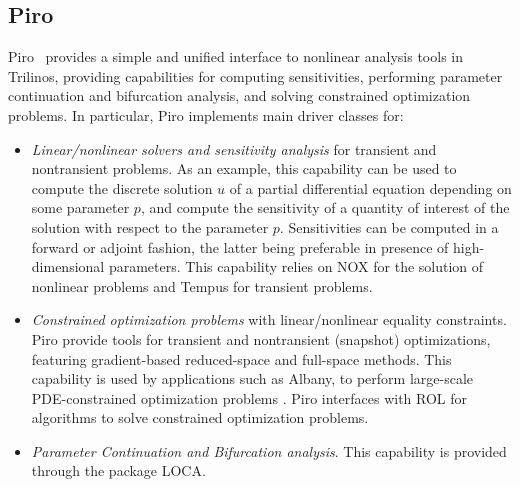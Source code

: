 \subsection{Piro}
Piro~\cite{osti_1231283} provides a simple and unified interface to nonlinear analysis tools in Trilinos, providing capabilities for computing sensitivities, performing parameter continuation and bifurcation analysis, and solving constrained optimization problems.
In particular, Piro implements main driver classes for:
\begin{itemize}
	\item \emph{Linear/nonlinear solvers and sensitivity analysis} for transient and nontransient problems. As an example, this capability can be used to compute the discrete solution $u$ of a partial differential equation depending on some parameter $p$, and compute the sensitivity of a quantity of interest of the solution with respect to the parameter $p$. Sensitivities can be computed in a forward or adjoint fashion, the latter being preferable in presence of high-dimensional parameters. This capability relies on NOX for the solution of nonlinear problems and Tempus for transient problems.
	\item \emph{Constrained optimization problems} with linear/nonlinear equality constraints. Piro provide tools for transient and nontransient (snapshot) optimizations, featuring gradient-based reduced-space and full-space methods. This capability is used by applications such as Albany, to perform large-scale PDE-constrained optimization problems \cite{Perego2022}. Piro interfaces with ROL for algorithms to solve constrained optimization problems.
\item \emph{Parameter Continuation and Bifurcation analysis}. This capability is provided through the package LOCA.
\end{itemize}
